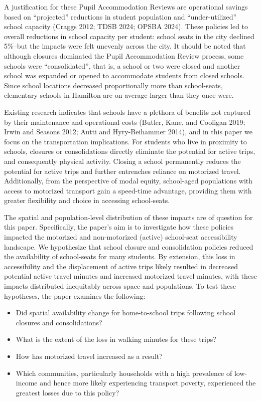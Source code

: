 \documentclass[
default
]{sn-jnl}
\providecommand{\tightlist}{%
  \setlength{\itemsep}{0pt}\setlength{\parskip}{0pt}}\usepackage{longtable,booktabs,array}
\begin{document}
A justification for these Pupil Accommodation Reviews are operational
savings based on ``projected'' reductions in student population and
``under-utilized'' school capacity (Craggs 2012; TDSB 2024; OPSBA 2024).
These policies led to overall reductions in school capacity per student:
school seats in the city declined 5\%--but the impacts were felt
unevenly across the city. It should be noted that although closures
dominated the Pupil Accommodation Review process, some schools were
``consolidated'', that is, a school or two were closed and another
school was expanded or opened to accommodate students from closed
schools. Since school locations decreased proportionally more than
school-seats, elementary schools in Hamilton are on average larger than
they once were.

Existing research indicates that schools have a plethora of benefits not
captured by their maintenance and operational costs (Butler, Kane, and
Cooligan 2019; Irwin and Seasons 2012; Autti and Hyry-Beihammer 2014),
and in this paper we focus on the transportation implications. For
students who live in proximity to schools, closures or consolidations
directly eliminate the potential for active trips, and consequently
physical activity. Closing a school permanently reduces the potential
for active trips and further entrenches reliance on motorized travel.
Additionally, from the perspective of modal equity, school-aged
populations with access to motorized transport gain a speed-time
advantage, providing them with greater flexibility and choice in
accessing school-seats.

The spatial and population-level distribution of these impacts are of
question for this paper. Specifically, the paper's aim is to investigate
how these policies impacted the motorized and non-motorized (active)
school-seat accessibility landscape. We hypothesize that school closure
and consolidation policies reduced the availability of school-seats for
many students. By extension, this loss in accessibility and the
displacement of active trips likely resulted in decreased potential
active travel minutes and increased motorized travel minutes, with these
impacts distributed inequitably across space and populations. To test
these hypotheses, the paper examines the following:

\begin{itemize}
\tightlist
\item
  Did spatial availability change for home-to-school trips following
  school closures and consolidations?
\item
  What is the extent of the loss in walking minutes for these trips?
\item
  How has motorized travel increased as a result?
\item
  Which communities, particularly households with a high prevalence of
  low-income and hence more likely experiencing transport poverty,
  experienced the greatest losses due to this policy?
\end{itemize}
\end{document}
